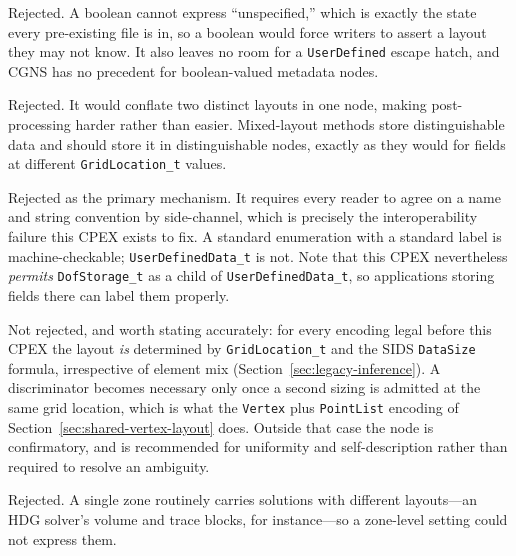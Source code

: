 \documentclass[11pt,letterpaper]{article}
\begin{document}
\begin{description}[leftmargin=2em]
\item[A boolean \texttt{Discontinuous} flag.]  Rejected.  A boolean
  cannot express ``unspecified,'' which is exactly the state every
  pre-existing file is in, so a boolean would force writers to assert
  a layout they may not know.  It also leaves no room for a
  \texttt{UserDefined} escape hatch, and CGNS has no precedent for
  boolean-valued metadata nodes.

\item[A third \texttt{MixedStorage} value.]  Rejected.  It would
  conflate two distinct layouts in one node, making post-processing
  harder rather than easier.  Mixed-layout methods store
  distinguishable data and should store it in distinguishable nodes,
  exactly as they would for fields at different
  \texttt{GridLocation\_t} values.

\item[Encoding the layout in \texttt{UserDefinedData\_t}.]  Rejected as
  the primary mechanism.  It requires every reader to agree on a name
  and string convention by side-channel, which is precisely the
  interoperability failure this CPEX exists to fix.  A standard
  enumeration with a standard label is machine-checkable;
  \texttt{UserDefinedData\_t} is not.  Note that this CPEX
  nevertheless \emph{permits} \texttt{DofStorage\_t} as a child of
  \texttt{UserDefinedData\_t}, so applications storing fields there
  can label them properly.

\item[Deriving the layout from array sizes.]  Not rejected, and worth
  stating accurately: for every encoding legal before this CPEX the
  layout \emph{is} determined by \texttt{GridLocation\_t} and the SIDS
  \texttt{DataSize} formula, irrespective of element mix
  (Section~\ref{sec:legacy-inference}).  A discriminator becomes
  necessary only once a second sizing is admitted at the same grid
  location, which is what the \texttt{Vertex} plus \texttt{PointList}
  encoding of Section~\ref{sec:shared-vertex-layout} does.  Outside
  that case the node is confirmatory, and is recommended for
  uniformity and self-description rather than required to resolve an
  ambiguity.

\item[Placing the node on \texttt{Zone\_t} or \texttt{Base\_t}.]
  Rejected.  A single zone routinely carries solutions with different
  layouts---an HDG solver's volume and trace blocks, for
  instance---so a zone-level
  setting could not express them.
\end{description}
\end{document}
